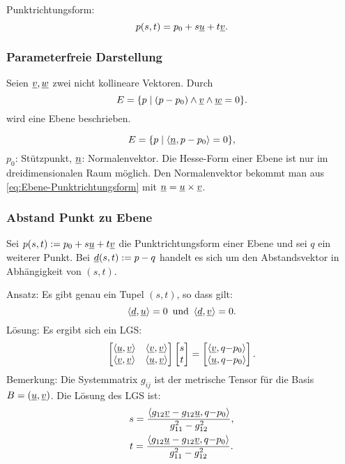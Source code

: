 Punktrichtungsform:
\begin{equation}\label{eq:Ebene-Punktrichtungsform}
p(s,t) = p_0+s\underline{u}+t\underline{v}.
\end{equation}

\subsubsection{Parameterfreie Darstellung}
Seien $\underline{v}, \underline{w}$ zwei nicht kollineare Vektoren.
Durch
\begin{equation}
E = \{p\mid (p-p_0)\wedge\underline{v}\wedge\underline{w}=0\}.
\end{equation}
wird eine Ebene beschrieben.

\begin{equation}
E = \{p\mid \langle\underline{n},p-p_0\rangle=0\},
\end{equation}
$p_0$: Stützpunkt, $\underline{n}$: Normalenvektor. Die Hesse-Form einer
Ebene ist nur im dreidimensionalen Raum möglich.
Den Normalenvektor bekommt man aus \eqref{eq:Ebene-Punktrichtungsform}
mit $\underline{n} = \underline{u}\times\underline{v}$.

\subsubsection{Abstand Punkt zu Ebene}
Sei $p(s,t):=p_0+s\underline{u}+t\underline{v}$ die Punktrichtungsform einer Ebene
und sei $q$ ein weiterer Punkt. Bei $\underline{d}(s,t):=p-q$ handelt es sich um
den Abstandsvektor in Abhängigkeit von $(s,t)$.

Ansatz: Es gibt genau ein Tupel $(s,t)$, so dass gilt:
\begin{equation}
\langle\underline{d},\underline{u}\rangle=0\enspace\text{und}\enspace
\langle\underline{d},\underline{v}\rangle=0.
\end{equation}
Lösung: Es ergibt sich ein LGS:
\begin{equation}
\begin{bmatrix}
\langle\underline{u},\underline{v}\rangle & \langle\underline{v},\underline{v}\rangle\\
\langle\underline{v},\underline{v}\rangle & \langle\underline{u},\underline{v}\rangle
\end{bmatrix}
\begin{bmatrix}
s\\ t
\end{bmatrix}
= \begin{bmatrix}
\langle\underline{v},q{-}p_0\rangle\\
\langle\underline{u},q{-}p_0\rangle
\end{bmatrix}.
\end{equation}
Bemerkung: Die Systemmatrix $g_{ij}$ ist der metrische Tensor für die
Basis $B=(\underline{u},\underline{v})$. Die Lösung des LGS ist:
\begin{gather}
s = \frac
  {\langle g_{12}\underline{v}-g_{12}\underline{u}, q{-}p_0\rangle}
  {g_{11}^2-g_{12}^2},\\
t = \frac
  {\langle g_{12}\underline{u}-g_{12}\underline{v}, q{-}p_0\rangle}
  {g_{11}^2-g_{12}^2}.
\end{gather}

